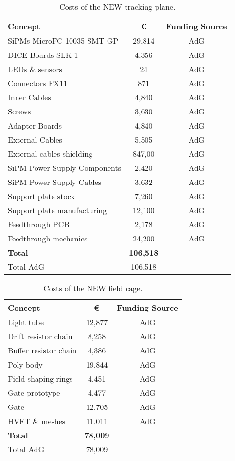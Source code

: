 \begin{table}[h!]
\begin{center}
\begin{tabular}{|l|c|c|}
\hline
 Concept & \euro & Funding Source \\
 \hline
SiPMs MicroFC-10035-SMT-GP &	29,814 & AdG \\
DICE-Boards SLK-1	&	4,356 & AdG \\
LEDs \& sensors	&	24 & AdG \\
Connectors FX11	&	871 & AdG \\
Inner Cables	&	4,840 & AdG \\
Screws	&	3,630 & AdG \\
Adapter Boards &	4,840 & AdG \\
External Cables &	5,505 & AdG \\
External cables shielding	&	847,00 & AdG \\
SiPM Power Supply Components	& 2,420 & AdG \\
SiPM Power Supply Cables	& 3,632 & AdG \\
Support plate stock	& 7,260 & AdG \\
Support plate manufacturing  & 12,100 &  AdG \\
 Feedthrough PCB	&	2,178 & AdG \\
Feedthrough mechanics &	 24,200 & AdG \\
  \hline
{\bf Total}	&	{\bf 106,518}	& \\
  Total AdG	&	106,518 	& \\
 \hline\hline
\end{tabular}  
\caption{Costs of the NEW tracking plane.}
\label{tab.new:TP}
\end{center}
\end{table} 

\begin{table}[h!]
\begin{center}
\begin{tabular}{|l|c|c|}
\hline
 Concept & \euro & Funding Source \\
 \hline
 Light tube & 12,877 & AdG \\
 Drift resistor chain & 8,258 & AdG \\
 Buffer resistor chain & 4,386 & AdG\\
 Poly body & 19,844 & AdG \\
 Field shaping rings & 4,451 & AdG \\
 Gate prototype & 4,477 & AdG \\
 Gate & 12,705 & AdG \\
 HVFT \& meshes & 11,011 & AdG \\
  \hline
{\bf Total} &	{\bf 78,009}	& \\
  Total AdG	&	78,009	& \\
 \hline\hline
\end{tabular}  
\caption{Costs of the NEW field cage.}
\label{tab.new:FC}
\end{center}
\end{table} 

